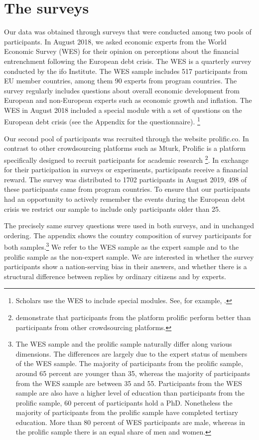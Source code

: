 \section{The surveys }
Our data was obtained through surveys that were conducted among two pools of
participants. In August 2018, we asked economic experts from the World
Economic Survey (WES) for their opinion on perceptions about the financial
entrenchment following the European debt crisis. The WES is a quarterly
survey conducted by the ifo Institute. The WES sample includes 517
participants from EU member countries, among them 90 experts from program countries.
The survey regularly includes questions about overall economic development
from European and non-European experts such as economic growth and
inflation. The WES in August 2018 included a special module with a set of
questions on the European debt crisis (see the Appendix for the
questionnaire). \footnote{Scholars use the WES to include special modules. See, for example, \cite{mosler}.}

Our second pool of participants was recruited through the website
prolific.co. In contrast to other crowdsourcing platforms such as Mturk,
Prolific is a platform specifically designed to recruit participants for
academic research \footnote{\cite{Peer} demonstrate that participants from
the platform prolific perform better than participants from other
crowdsourcing platforms.}. In exchange for their participation in surveys or
experiments, participants receive a financial reward. The survey was
distributed to 1702 participants in August 2019, 498 of these participants
came from program countries. To ensure that our participants had an
opportunity to actively remember the events during the European debt crisis
we restrict our sample to include only participants older than 25.

The precisely same survey questions were used in both surveys, and in
unchanged ordering. The appendix shows the country composition of survey
participants for both samples.\footnote{%
The WES sample and the prolific sample naturally differ along various
dimensions. The differences are largely due to the expert status of members
of the WES sample. The majority of participants from the prolific sample,
around 65 percent are younger than 35, whereas the majority of participants
from the WES sample are between 35 and 55. Participants from the WES sample
are also have a higher level of education than participants from the
prolific sample, 60 percent of participants hold a PhD. Nonetheless the
majority of participants from the prolific sample have completed tertiary
education. More than 80 percent of WES participants are male, whereas in the
prolific sample there is an equal share of men and women.} We refer to the
WES sample as the expert sample and to the prolific sample as the non-expert
sample. We are interested in whether the survey participants show a
nation-serving bias in their answers, and whether there is a structural
difference between replies by ordinary citizens and by experts.